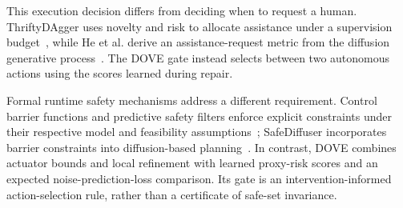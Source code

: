 \documentclass[9pt,journal]{IEEEtran}
\newcommand{\DOVE}{DOVE}
\begin{document}
This execution decision differs from deciding when to request a human.
ThriftyDAgger uses novelty and risk to allocate assistance under a
supervision budget~\cite{hoque2021thrifty}, while He et al. derive an
assistance-request metric from the diffusion generative
process~\cite{he2026uncertainty}. The \DOVE{} gate instead selects
between two autonomous actions using the scores learned during repair.

Formal runtime safety mechanisms address a different requirement.
Control barrier functions and predictive safety filters enforce explicit
constraints under their respective model and feasibility
assumptions~\cite{ames2019cbf,wabersich2021predictive}; SafeDiffuser
incorporates barrier constraints into diffusion-based
planning~\cite{xiao2025safediffuser}. In contrast, \DOVE{} combines actuator bounds and local refinement with learned
proxy-risk scores and an expected noise-prediction-loss comparison. Its gate is an intervention-informed action-selection rule,
rather than a certificate of safe-set invariance.






\end{document}
